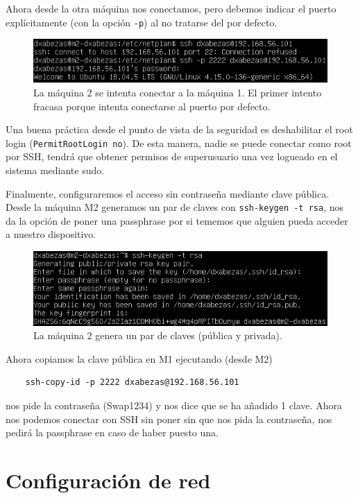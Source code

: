 \documentclass{article}
\begin{document}
Ahora desde la otra máquina
nos conectamos, pero debemos indicar el puerto explícitamente (con la opción \texttt{-p}) al no tratarse del por defecto.

\begin{figure}[H]
	\centering
	\includegraphics[width=140mm]{imgs/ssh-port}
	\caption{La máquina 2 se intenta conectar a la máquina 1. El primer intento fracasa porque intenta conectarse al puerto por defecto.}
	\label{fig:ssh-port}
\end{figure}

Una buena práctica desde el punto de vista de la seguridad es deshabilitar el root login (\texttt{PermitRootLogin no}). De esta manera,
nadie se puede conectar como root por SSH, tendrá que obtener permisos de superusuario una vez logueado en el sistema mediante sudo.

Finalmente, configuraremos el acceso sin contraseña mediante clave pública. Desde la máquina M2 generamos un par de claves con
\texttt{ssh-keygen -t rsa}, nos da la opción de poner una passphrase por si tememos que alguien pueda acceder a nuestro dispositivo.

\begin{figure}[H]
	\centering
	\includegraphics[width=140mm]{imgs/keygen}
	\caption{La máquina 2 genera un par de claves (pública y privada).}
	\label{fig:keygen}
\end{figure}

Ahora copiamos la clave pública en M1 ejecutando (desde M2)
\begin{verbatim}
	ssh-copy-id -p 2222 dxabezas@192.168.56.101
\end{verbatim}

nos pide la contraseña (Swap1234) y nos dice que se ha añadido 1 clave. Ahora nos podemos conectar con SSH sin poner sin que nos pida
la contraseña, nos pedirá la passphrase en caso de haber puesto una.

\section{Configuración de red}
\end{document}
